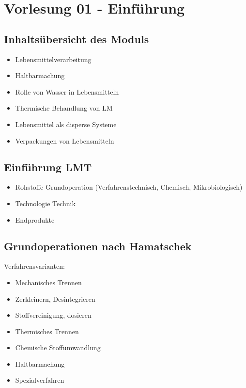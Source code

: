 \documentclass[a4paper,10pt,twoside]{article}
\begin{document}
\raggedbottom
\setcounter{tocdepth}{1}
\tableofcontents

\pagebreak




\section*{Vorlesung 01 - Einführung}
\addtocounter{section}{1}
\subsection{Inhaltsübersicht des Moduls}
\begin{itemize}
\item Lebensmittelverarbeitung
\item Haltbarmachung
\item Rolle von Wasser in Lebensmitteln
\item Thermische Behandlung von LM 
\item Lebensmittel als disperse Systeme
\item Verpackungen von Lebensmitteln
\end{itemize}

\subsection{Einführung LMT}
\begin{itemize}
\item Rohstoffe \RA Grundoperation (Verfahrenstechnisch, Chemisch, Mikrobiologisch)
\item Technologie \RA Technik
\item Endprodukte
\end{itemize}

\subsection{Grundoperationen nach Hamatschek}

Verfahrensvarianten:
\begin{itemize}
\item Mechanisches Trennen
\item Zerkleinern, Desintegrieren
\item Stoffvereinigung, dosieren
\item Thermisches Trennen
\item Chemische Stoffumwandlung
\item Haltbarmachung
\item Spezialverfahren
\end{itemize}
\end{document}
